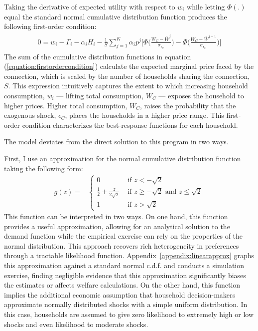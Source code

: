 \documentclass[12pt]{article}
\begin{document}
Taking the derivative of expected utility with respect to $w_i$ while letting $\Phi(.)$ equal the standard normal cumulative distribution function produces the following first-order condition:
\begin{align}
\label{equation:firstordercondition}
\begin{split}
 0 =  w_i - \Gamma_i - \alpha_i H_{i} -  \frac{1}{S}  \sum_{j=1}^{K} \alpha_i  p^{j} \Big [ \Phi \Big( \frac{W_C - \overline{W}^{j}}{\sigma_{\epsilon_C}} \Big) - \Phi \Big( \frac{ W_C - \overline{W}^{j-1}}{\sigma_{\epsilon_C}} \Big)   \Big ]
\end{split}
\end{align}
The sum of the cumulative distribution functions in equation (\ref{equation:firstordercondition}) calculate the expected marginal price faced by the connection, which is scaled by the number of households sharing the connection, $S$.  This expression intuitively captures the extent to which increasing household consumption, $w_i$ --- lifting total consumption, $W_C$ --- exposes the household to higher prices.  Higher total consumption, $W_C$, raises the probability that the exogenous shock, $\epsilon_C$, places the households in a higher price range.  This first-order condition characterizes the best-response functions for each household.

The model deviates from the direct solution to this program in two ways.  

First, I use an approximation for the normal cumulative distribution function taking the following form:
\begin{align*}
g(z)=& 
\begin{cases}
       0  							  & \text{ if } z    < -\sqrt{2}                       \\
     \frac{1}{2} + \frac{z}{2\sqrt2}  & \text{ if } z \geq -\sqrt{2} \text{ and } z \leq \sqrt{2}  \\
       1 						      & \text{ if } z    >  \sqrt{2}
    \end{cases}
\end{align*}
This function can be interpreted in two ways.  On one hand, this function provides a useful approximation, allowing for an analytical solution to the demand function while the empirical exercise can rely on the properties of the normal distribution.  This approach recovers rich heterogeneity in preferences through a tractable likelihood function.  Appendix~\ref{appendix:linearapprox} graphs this approximation against a standard normal c.d.f. and conducts a simulation exercise, finding negligible evidence that this approximation significantly biases the estimates or affects welfare calculations.  On the other hand, this function implies the additional economic assumption that household decision-makers approximate normally distributed shocks with a simple uniform distribution.  In this case, households are assumed to give zero likelihood to extremely high or low shocks and even likelihood to moderate shocks.  
\end{document}
